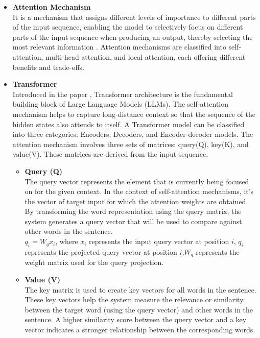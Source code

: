 \documentclass{ws-ijait}
\begin{document}
\begin{itemize}
	\item \textbf{Attention Mechanism}\\
	It is a mechanism that assigns different levels of importance to different parts of the input sequence, enabling the model to selectively focus on different parts of the input sequence when producing an output, thereby selecting the most relevant information \cite{bahdanau2014neural}. Attention mechanisms are classified into self-attention, multi-head attention, and local attention, each offering different benefits and trade-offs.
	
	\item \textbf{Transformer}\\
	Introduced in the paper \cite{vaswani2017attention}, Transformer architecture is the fundamental building block of Large Language Models (LLMs). The self-attention mechanism helps to capture long-distance context so that the sequence of the hidden states also attends to itself. A Transformer model can be classified into three categories: Encoders, Decoders, and Encoder-decoder models\cite{sutskever2014sequence}. The attention mechanism involves three sets of matrices: query(Q), key(K), and value(V). These matrices are derived from the input sequence.
	\begin{itemize}
		\item \textbf{Query (Q)}\\
		The query vector represents the element that is currently being focused on for the given context. In the context of self-attention mechanisms, it's the vector of target input for which the attention weights are obtained. By transforming the word representation using the query matrix, the system generates a query vector that will be used to compare against other words in the sentence.	\\
		$q_{i}=W_{q}x_{i}$,  where $x_{i}$ represents the input query vector at position $i$, $q_{i}$ represents the projected query vector at position $i$,$W_{q}$ represents the weight matrix used for the query projection.
		\item \textbf{Value (V)}\\
		The key matrix is used to create key vectors for all words in the sentence. These key vectors help the system measure the relevance or similarity between the target word (using the query vector) and other words in the sentence. A higher similarity score between the query vector and a key vector indicates a stronger relationship between the corresponding words.\\

\end{itemize}
\end{itemize}
\end{document}
